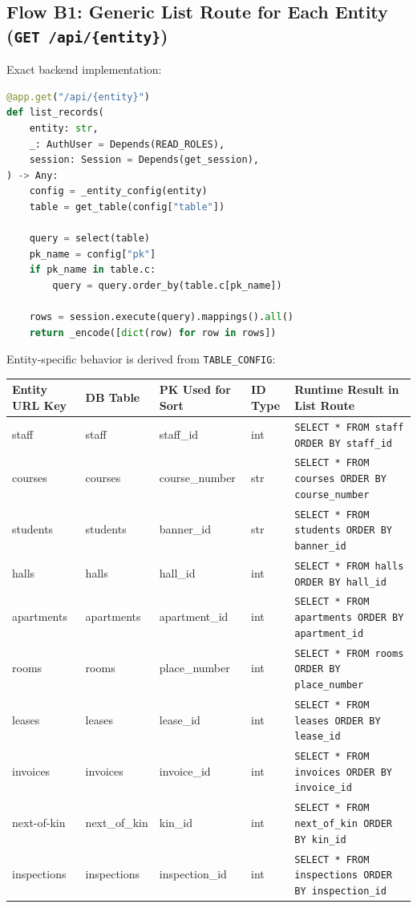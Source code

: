 \documentclass[11pt,a4paper]{article}
\begin{document}
\subsection{Flow B1: Generic List Route for Each Entity (\texttt{GET /api/\{entity\}})}
Exact backend implementation:
\begin{lstlisting}[language=Python,caption={Generic list route used for every entity}]
@app.get("/api/{entity}")
def list_records(
    entity: str,
    _: AuthUser = Depends(READ_ROLES),
    session: Session = Depends(get_session),
) -> Any:
    config = _entity_config(entity)
    table = get_table(config["table"])

    query = select(table)
    pk_name = config["pk"]
    if pk_name in table.c:
        query = query.order_by(table.c[pk_name])

    rows = session.execute(query).mappings().all()
    return _encode([dict(row) for row in rows])
\end{lstlisting}

Entity-specific behavior is derived from \texttt{TABLE\_CONFIG}:
\begin{longtable}{>{\raggedright\arraybackslash}p{} >{\raggedright\arraybackslash}p{} >{\raggedright\arraybackslash}p{} >{\raggedright\arraybackslash}p{} >{\raggedright\arraybackslash}p{}}
\toprule
\textbf{Entity URL Key} & \textbf{DB Table} & \textbf{PK Used for Sort} & \textbf{ID Type} & \textbf{Runtime Result in List Route} \\
\midrule
\endhead
staff & staff & staff\_id & int & \texttt{SELECT * FROM staff ORDER BY staff\_id} \\
courses & courses & course\_number & str & \texttt{SELECT * FROM courses ORDER BY course\_number} \\
students & students & banner\_id & str & \texttt{SELECT * FROM students ORDER BY banner\_id} \\
halls & halls & hall\_id & int & \texttt{SELECT * FROM halls ORDER BY hall\_id} \\
apartments & apartments & apartment\_id & int & \texttt{SELECT * FROM apartments ORDER BY apartment\_id} \\
rooms & rooms & place\_number & int & \texttt{SELECT * FROM rooms ORDER BY place\_number} \\
leases & leases & lease\_id & int & \texttt{SELECT * FROM leases ORDER BY lease\_id} \\
invoices & invoices & invoice\_id & int & \texttt{SELECT * FROM invoices ORDER BY invoice\_id} \\
next-of-kin & next\_of\_kin & kin\_id & int & \texttt{SELECT * FROM next\_of\_kin ORDER BY kin\_id} \\
inspections & inspections & inspection\_id & int & \texttt{SELECT * FROM inspections ORDER BY inspection\_id} \\
\bottomrule
\end{longtable}
\end{document}
